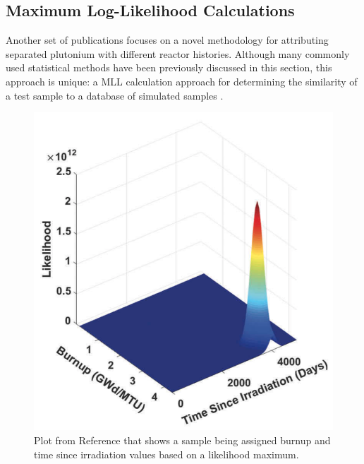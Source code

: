 
\subsection{Maximum Log-Likelihood Calculations}

Another set of publications focuses on a novel methodology for attributing
separated plutonium with different reactor histories.  Although many commonly
used statistical methods have been previously discussed in this section, this
approach is unique: a \gls{MLL} calculation approach for determining the
similarity of a test sample to a database of simulated samples
\cite{mll_method}.  

\begin{figure}[!htb]
  \centering
  \includegraphics[width=0.6\linewidth]{./chapters/litrev/tamu.png}
  \caption[Example of likelihood maximum predicting burnup and time since 
           irradiation]
          {Plot from Reference \cite{mll_method} that shows a sample being 
           assigned burnup and time since irradiation values based on a 
           likelihood maximum.}
  \label{fig:tamu}
\end{figure}

